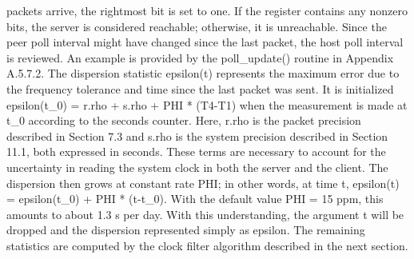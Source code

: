  packets arrive, the rightmost bit is set to one. If the register
 contains any nonzero bits, the server is considered reachable;
 otherwise, it is unreachable. Since the peer poll interval might
have changed since the last packet, the host poll interval is
 reviewed. An example is provided by the poll_update() routine in
 Appendix A.5.7.2.
 The dispersion statistic epsilon(t) represents the maximum error due
 to the frequency tolerance and time since the last packet was sent.
 It is initialized
 epsilon(t_0) = r.rho + s.rho + PHI * (T4-T1)
 when the measurement is made at t_0 according to the seconds counter.
 Here, r.rho is the packet precision described in Section 7.3 and
 s.rho is the system precision described in Section 11.1, both
 expressed in seconds. These terms are necessary to account for the
 uncertainty in reading the system clock in both the server and the
 client.
 The dispersion then grows at constant rate PHI; in other words, at
 time t, epsilon(t) = epsilon(t_0) + PHI * (t-t_0). With the default
 value PHI = 15 ppm, this amounts to about 1.3 s per day. With this
 understanding, the argument t will be dropped and the dispersion
 represented simply as epsilon. The remaining statistics are computed
 by the clock filter algorithm described in the next section.
